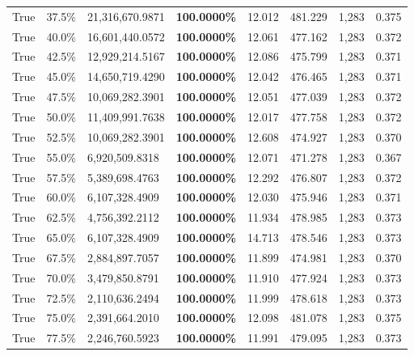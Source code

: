 \begin{table}[H]
\begin{tabular}{lllrllll}
\cline{1-8}
True & 37.5\% & 21,316,670.9871 & \bfseries \color{red} 100.0000\% & 12.012 & 481.229 & 1,283 & 0.375 \\
\cline{1-8}
True & 40.0\% & 16,601,440.0572 & \bfseries \color{red} 100.0000\% & 12.061 & 477.162 & 1,283 & 0.372 \\
\cline{1-8}
True & 42.5\% & 12,929,214.5167 & \bfseries \color{red} 100.0000\% & 12.086 & 475.799 & 1,283 & 0.371 \\
\cline{1-8}
True & 45.0\% & 14,650,719.4290 & \bfseries \color{red} 100.0000\% & 12.042 & 476.465 & 1,283 & 0.371 \\
\cline{1-8}
True & 47.5\% & 10,069,282.3901 & \bfseries \color{red} 100.0000\% & 12.051 & 477.039 & 1,283 & 0.372 \\
\cline{1-8}
True & 50.0\% & 11,409,991.7638 & \bfseries \color{red} 100.0000\% & 12.017 & 477.758 & 1,283 & 0.372 \\
\cline{1-8}
True & 52.5\% & 10,069,282.3901 & \bfseries \color{red} 100.0000\% & 12.608 & 474.927 & 1,283 & 0.370 \\
\cline{1-8}
True & 55.0\% & 6,920,509.8318 & \bfseries \color{red} 100.0000\% & 12.071 & 471.278 & 1,283 & 0.367 \\
\cline{1-8}
True & 57.5\% & 5,389,698.4763 & \bfseries \color{red} 100.0000\% & 12.292 & 476.807 & 1,283 & 0.372 \\
\cline{1-8}
True & 60.0\% & 6,107,328.4909 & \bfseries \color{red} 100.0000\% & 12.030 & 475.946 & 1,283 & 0.371 \\
\cline{1-8}
True & 62.5\% & 4,756,392.2112 & \bfseries \color{red} 100.0000\% & 11.934 & 478.985 & 1,283 & 0.373 \\
\cline{1-8}
True & 65.0\% & 6,107,328.4909 & \bfseries \color{red} 100.0000\% & 14.713 & 478.546 & 1,283 & 0.373 \\
\cline{1-8}
True & 67.5\% & 2,884,897.7057 & \bfseries \color{red} 100.0000\% & 11.899 & 474.981 & 1,283 & 0.370 \\
\cline{1-8}
True & 70.0\% & 3,479,850.8791 & \bfseries \color{red} 100.0000\% & 11.910 & 477.924 & 1,283 & 0.373 \\
\cline{1-8}
True & 72.5\% & 2,110,636.2494 & \bfseries \color{red} 100.0000\% & 11.999 & 478.618 & 1,283 & 0.373 \\
\cline{1-8}
True & 75.0\% & 2,391,664.2010 & \bfseries \color{red} 100.0000\% & 12.098 & 481.078 & 1,283 & 0.375 \\
\cline{1-8}
True & 77.5\% & 2,246,760.5923 & \bfseries \color{red} 100.0000\% & 11.991 & 479.095 & 1,283 & 0.373 \\

\end{tabular}
\end{table}
